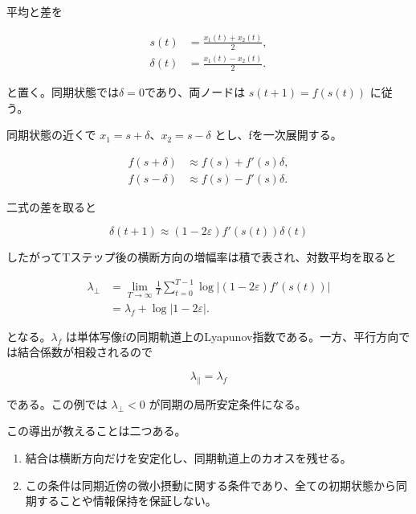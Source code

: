 \documentclass[11pt,a4paper]{ltjsarticle}
\begin{document}
平均と差を\par

\[
\begin{aligned}
s(t)&=\frac{x_1(t)+x_2(t)}{2},\\
\delta(t)&=\frac{x_1(t)-x_2(t)}{2}.
\end{aligned}
\]

と置く。同期状態では\(\delta=0\)であり、両ノードは \(s(t+1)=f(s(t))\) に従う。\par

同期状態の近くで \(x_1=s+\delta\)、\(x_2=s-\delta\) とし、fを一次展開する。\par

\[
\begin{aligned}
f(s+\delta)&\approx f(s)+f'(s)\delta,\\
f(s-\delta)&\approx f(s)-f'(s)\delta.
\end{aligned}
\]

二式の差を取ると\par

\[
\delta(t+1)\approx (1-2\varepsilon)f'\!\left(s(t)\right)\delta(t)
\]

したがってTステップ後の横断方向の増幅率は積で表され、対数平均を取ると\par

\[
\begin{aligned}
\lambda_{\perp}
&=\lim_{T\to\infty}\frac{1}{T}\sum_{t=0}^{T-1}
\log\left|(1-2\varepsilon)f'\!\left(s(t)\right)\right|\\
&=\lambda_f+\log|1-2\varepsilon|.
\end{aligned}
\]

となる。\(\lambda_f\) は単体写像fの同期軌道上のLyapunov指数である。一方、平行方向では結合係数が相殺されるので\par

\[
\lambda_{\parallel}=\lambda_f
\]

である。この例では \(\lambda_{\perp}<0\) が同期の局所安定条件になる。\par

この導出が教えることは二つある。\par

\begin{enumerate}

\item 結合は横断方向だけを安定化し、同期軌道上のカオスを残せる。

\item この条件は同期近傍の微小摂動に関する条件であり、全ての初期状態から同期することや情報保持を保証しない。

\end{enumerate}
\end{document}
